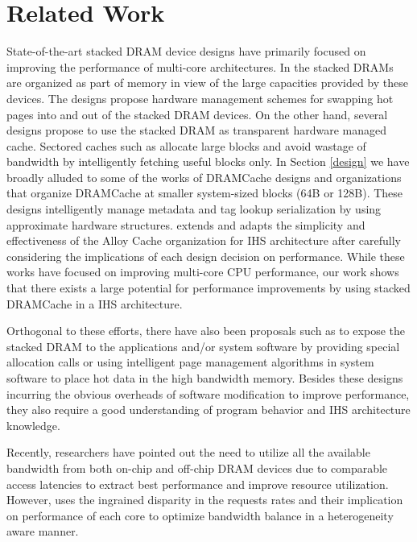 \section{Related Work} \label{related-work}
State-of-the-art stacked DRAM device designs have primarily focused on improving the performance of multi-core architectures. %
In \cite{pom,cameo} the stacked DRAMs are organized as part of memory in view of the large capacities provided by these devices. The designs propose hardware management schemes for swapping hot pages into and out of the stacked DRAM devices.
On the other hand, several designs propose to use the stacked DRAM as transparent hardware managed cache. Sectored caches such as \cite{footprint,unison-cache} allocate large blocks and avoid wastage of bandwidth by intelligently fetching useful blocks only. In Section \ref{design} we have broadly alluded to some of the works of DRAMCache designs and organizations \cite{alloy,atcache,bimodal,loh-hill} that organize DRAMCache at smaller system-sized blocks (64B or 128B).
These designs intelligently manage metadata and tag lookup serialization by using approximate hardware structures. \cachename extends and adapts the simplicity and effectiveness of the Alloy Cache organization for IHS architecture after carefully considering the implications of each design decision on performance. 
While these works have focused on improving multi-core CPU performance, our work shows that there exists a large potential for performance improvements by using stacked DRAMCache in a IHS architecture. 
\par Orthogonal to these efforts, there have also been proposals such as \cite{software-dram} to expose the stacked DRAM to the applications and/or system software by providing special allocation calls or using intelligent page management algorithms in system software to place hot data in the high bandwidth memory. Besides these designs incurring the obvious overheads of software modification to improve performance, they also require a good understanding of program behavior and IHS architecture knowledge.
\par Recently, researchers have pointed out the need to utilize all the available bandwidth from both on-chip and off-chip DRAM devices due to comparable access latencies \cite{mostly-clean,mainak-hpca,bear,micro-refresh} to extract best performance and improve resource utilization. However, \cachename uses the ingrained disparity in the requests rates and their implication on performance of each core to optimize bandwidth balance in a heterogeneity aware manner. 
